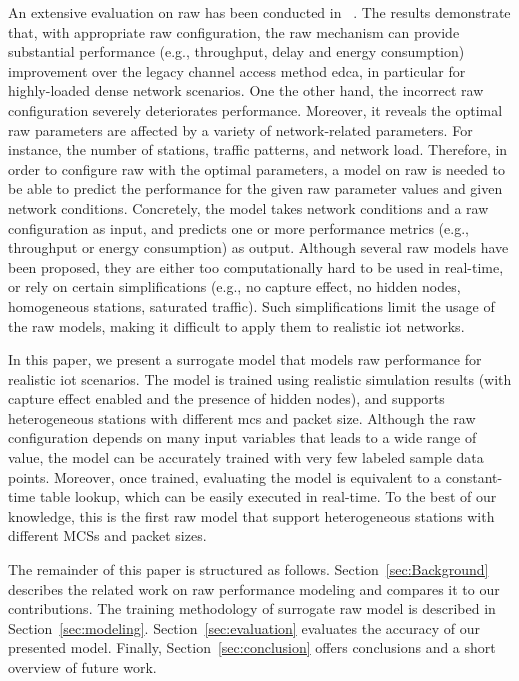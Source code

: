 An extensive evaluation on \gls{raw} has been conducted in ~\cite{WoWMoM2016}. The results demonstrate that, with appropriate \gls{raw} configuration, the \gls{raw} mechanism can provide substantial performance (e.g., throughput, delay and energy consumption) improvement over the legacy channel access method \gls{edca}, in particular for highly-loaded dense network scenarios. One the other hand, the incorrect \gls{raw} configuration severely deteriorates performance. Moreover, it reveals the optimal \gls{raw} parameters are affected by a variety of network-related parameters. For instance, the number of stations, traffic patterns, and network load. Therefore, in order to configure \gls{raw} with the optimal parameters, a model on \gls{raw} is needed to be able to predict the performance for the given \gls{raw} parameter values and given network conditions. Concretely, the model takes network conditions and a \gls{raw} configuration as input, and predicts one or more performance metrics (e.g., throughput or energy consumption) as output. Although several \gls{raw} models have been proposed, they are either too computationally hard to be used in real-time, or rely on certain simplifications (e.g., no capture effect, no hidden nodes, homogeneous stations, saturated traffic). Such simplifications limit the usage of the \gls{raw} models, making it difficult to apply them to realistic \gls{iot} networks.

In this paper, we present a surrogate model that models \gls{raw} performance for realistic \gls{iot} scenarios. The model is trained using realistic simulation results (with capture effect enabled and the presence of hidden nodes), and supports heterogeneous stations with different \gls{mcs} and packet size. Although the \gls{raw} configuration depends on many input variables that leads to a wide range of value, the model can be accurately trained with very few labeled sample data points. Moreover, once trained, evaluating the model is equivalent to a constant-time table lookup, which can be easily executed in real-time. To the best of our knowledge, this is the first \gls{raw} model that support heterogeneous stations with different MCSs and packet sizes.


The remainder of this paper is structured as follows. Section~\ref{sec:Background} describes the  related work on \gls{raw} performance modeling and compares it to our contributions.
The training methodology of surrogate \gls{raw} model is described in Section~\ref{sec:modeling}. Section~\ref{sec:evaluation} evaluates the accuracy of our presented model. Finally, Section~\ref{sec:conclusion} offers conclusions and a short overview of future work.


